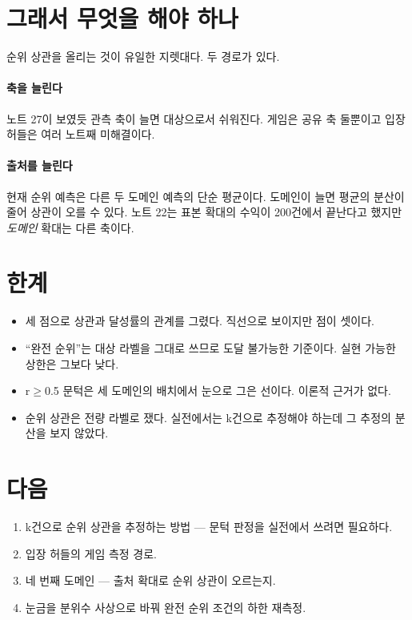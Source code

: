 \documentclass[10pt]{article}
\begin{document}
\section{그래서 무엇을 해야 하나}

순위 상관을 올리는 것이 유일한 지렛대다. 두 경로가 있다.

\paragraph{축을 늘린다}
노트 27이 보였듯 관측 축이 늘면 대상으로서 쉬워진다. 게임은 공유 축 둘뿐이고
입장 허들은 여러 노트째 미해결이다.

\paragraph{출처를 늘린다}
현재 순위 예측은 다른 두 도메인 예측의 단순 평균이다. 도메인이 늘면 평균의
분산이 줄어 상관이 오를 수 있다. 노트 22는 표본 확대의 수익이 200건에서 끝난다고
했지만 \emph{도메인} 확대는 다른 축이다.

\section{한계}

\begin{itemize}[leftmargin=1.1em,itemsep=0.15em]
\item 세 점으로 상관과 달성률의 관계를 그렸다. 직선으로 보이지만 점이 셋이다.
\item ``완전 순위''는 대상 라벨을 그대로 쓰므로 도달 불가능한 기준이다.
      실현 가능한 상한은 그보다 낮다.
\item r$\geq$0.5 문턱은 세 도메인의 배치에서 눈으로 그은 선이다. 이론적 근거가 없다.
\item 순위 상관은 전량 라벨로 쟀다. 실전에서는 k건으로 추정해야 하는데 그 추정의
      분산을 보지 않았다.
\end{itemize}

\section{다음}

\begin{enumerate}[leftmargin=1.3em,itemsep=0.15em]
\item k건으로 순위 상관을 추정하는 방법 --- 문턱 판정을 실전에서 쓰려면 필요하다.
\item 입장 허들의 게임 측정 경로.
\item 네 번째 도메인 --- 출처 확대로 순위 상관이 오르는지.
\item 눈금을 분위수 사상으로 바꿔 완전 순위 조건의 하한 재측정.
\end{enumerate}
\end{document}
